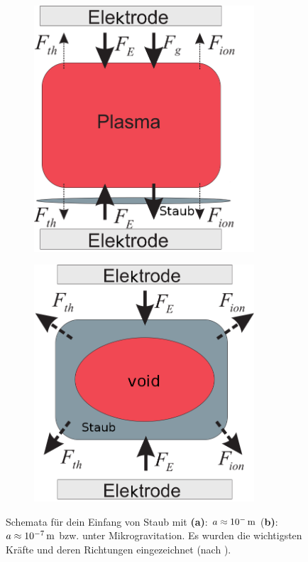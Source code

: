 \documentclass[numbers=noenddot,a4paper,notitlepage,twoside,BCOR15mm]{scrbook}
\newcommand{\tenpo}[1]{ 10^{#1}}
\newcommand{\fett}[1]{\textbf{#1}}
\begin{document}
				\begin{figure}[!h]
					\centering
					\begin{subfigure}[b]{0.45\textwidth}
						\includegraphics[width=0.9\textwidth,height=0.9\textwidth]{figs/directionsofforcesandtrappingmelzerlinks.png}
						\caption{}
						\label{img:linksdirection}
					\end{subfigure}
					\begin{subfigure}[b]{0.45\textwidth}
						\includegraphics[width=0.9\textwidth,height=0.9\textwidth]{figs/directionsofforcesandtrappingmelzerrechts.png}
						\caption{}
						\label{img:rechtsdirection}
					\end{subfigure}
					\caption{Schemata für dein Einfang von Staub mit \fett{(a)}: $a\approx\unit[\tenpo{-}]{m}$ (\fett{b)}: $a\approx\unit[\tenpo{-7}]{m}$ bzw. unter Mikrogravitation. Es wurden die wichtigsten Kräfte und deren Richtungen eingezeichnet (nach \cite{Melzer12}).}
					\label{img:kräfterichtungen}
				\end{figure}
\end{document}
